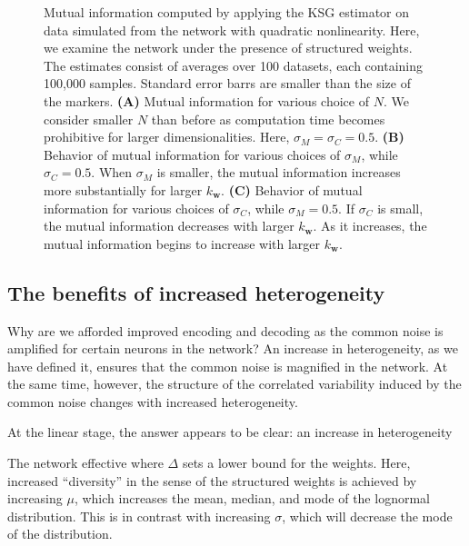 \documentclass[12pt]{article}
\begin{document}
	\begin{figure}[t]
		\centering
		\caption{Mutual information computed by applying the KSG estimator on data simulated from the network with quadratic nonlinearity. Here, we examine the network under the presence of structured weights. The estimates consist of averages over 100 datasets, each containing 100,000 samples. Standard error barrs are smaller than the size of the markers. \textbf{(A)} Mutual information for various choice of $N$. We consider smaller $N$ than before as computation time becomes prohibitive for larger dimensionalities. Here, $\sigma_M =\sigma_C=0.5$. \textbf{(B)} Behavior of mutual information for various choices of $\sigma_M$, while $\sigma_C=0.5$. When $\sigma_M$ is smaller, the mutual information increases more substantially for larger $k_{\mathbf{w}}$.  \textbf{(C)}  Behavior of mutual information for various choices of $\sigma_C$, while $\sigma_M=0.5$. If $\sigma_C$ is small, the mutual information decreases with larger $k_{\mathbf{w}}$. As it increases, the mutual information begins to increase with larger $k_{\mathbf{w}}$.}  
		\label{fig:mi_squared_struct}
	\end{figure}
	
	\subsection{The benefits of increased heterogeneity}
	Why are we afforded improved encoding and decoding as the common noise is amplified for certain neurons in the network? An increase in heterogeneity, as we have defined it, ensures that the common noise is magnified in the network. At the same time, however, the structure of the correlated variability induced by the common noise changes with increased heterogeneity. 
	
	At the linear stage, the answer appears to be clear: an increase in heterogeneity
	
	The network effective
where $\Delta$ sets a lower bound for the weights. Here, increased ``diversity'' in the sense of the structured weights is achieved by increasing $\mu$, which increases the mean, median, and mode of the lognormal distribution. This is in contrast with increasing $\sigma$, which will decrease the mode of the distribution.
\end{document}
